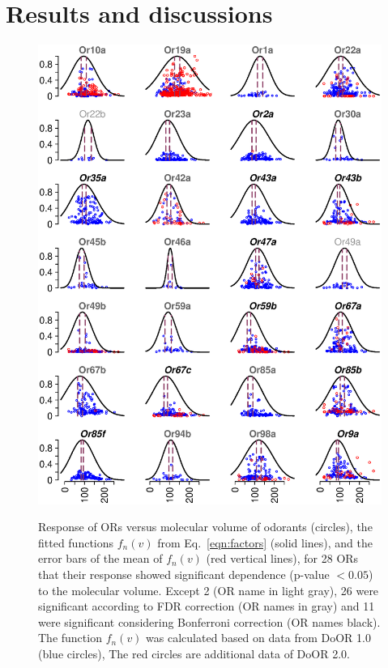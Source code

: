 \documentclass[fleqn,10pt]{wlscirep} %
\newcommand{\numberofreceptors}{ 28 }
\newcommand{\bonferroni}{ 11 }
\newcommand{\fdr}{ 26 }
\newcommand{\nocorrection}{ 2 }
\begin{document}
\section*{Results and discussions}
\begin{figure}
	\centering
		\includegraphics[width= \textwidth]{vol-res-}
		\label{fig:vol-res:all}		
	\caption{Response of ORs  versus molecular volume of odorants (circles),  
			the fitted functions $f_n(v)$ from Eq.~\ref{eqn:factors} (solid lines), 
			and the error bars of the mean of $f_n(v)$ (red vertical lines), 
			for \numberofreceptors ORs that their response showed significant dependence (p-value $<0.05$) to the molecular volume. 
			Except \nocorrection (OR name in light gray), \fdr were significant according to FDR correction (OR names in gray) and 
			\bonferroni were significant considering Bonferroni correction (OR names black).
			The function $f_n(v)$ was calculated based on data from DoOR 1.0 (blue circles), 
			The red circles are additional data of DoOR 2.0. 
		}
	\label{fig:vol-res}
\end{figure}
\end{document}
